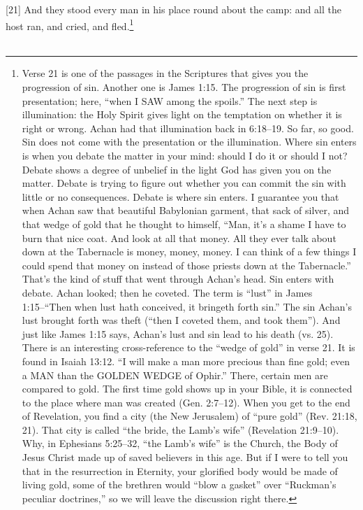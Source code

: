 [21] \textcolor[rgb]{0.00,0.00,1.00}{And they stood every man in his place round about the camp: and all the host ran, and cried, and fled.}\footnote{Verse 21 is one of the passages in the Scriptures that gives you the progression of sin. Another one is James 1:15. The progression of sin is first presentation; here, “when I SAW among the spoils.” The next step is illumination: the Holy Spirit gives light on the temptation on whether it is right or wrong. Achan had that illumination back in 6:18--19. So far, so good. Sin does not come with the presentation or the illumination. Where sin enters is when you debate the matter in your mind: should I do it or should I not? Debate shows a degree of unbelief in the light God has given you on the matter. Debate is trying to figure out whether you can commit the sin with little or no consequences. Debate is where sin enters. I guarantee you that when Achan saw that beautiful Babylonian garment, that sack of silver, and that wedge of gold that he thought to himself, ``Man, it’s a shame I have to burn that nice coat. And look at all that money. All they ever talk about down at the Tabernacle is money, money, money. I can think of a few things I could spend that money on instead of those priests down at the Tabernacle.'' That’s the kind of stuff that went through Achan’s head. Sin enters with debate. Achan looked; then he coveted. The term is “lust” in James 1:15--“Then when lust hath conceived, it bringeth forth sin.” The sin Achan’s lust brought forth was theft (“then I coveted them, and took them”). And just like James 1:15 says, Achan’s lust and sin lead to his death (vs. 25). There is an interesting cross-reference to the “wedge of gold” in verse 21. It is found in Isaiah 13:12. “I will make a man more precious than fine gold; even a MAN than the GOLDEN WEDGE of Ophir.” There, certain men are compared to gold. The first time gold shows up in your Bible, it is connected to the place where man was created (Gen. 2:7–12). When you get to the end of Revelation, you find a city (the New Jerusalem) of “pure gold” (Rev. 21:18, 21). That city is called “the bride, the Lamb’s wife” (Revelation 21:9–10). Why, in Ephesians 5:25–32, “the Lamb’s wife” is the Church, the Body of Jesus Christ made up of saved believers in this age. But if I were to tell you that in the resurrection in Eternity, your glorified body would be made of living gold, some of the brethren would “blow a gasket” over “Ruckman’s peculiar doctrines,” so we will leave the discussion right there.}\\\
